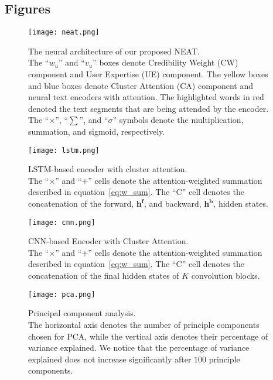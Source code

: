 \documentclass{bmcart}
\begin{document}
\begin{backmatter}
\pagebreak

\section*{Figures}
\begin{figure}[h!]
    \centering
    \captionsetup{justification=centering}
    \texttt{[image: neat.png]}
    \caption{The neural architecture of our proposed NEAT. \\ The ``$w_u$'' and ``$v_u$'' boxes denote Credibility Weight (CW) component and User Expertise (UE) component. The yellow boxes and blue boxes denote Cluster Attention (CA) component and neural text encoders with attention. The highlighted words in red denoted the text segments that are being attended by the encoder. The ``$\times$'', ``$\sum$'', and ``$\sigma$'' symbols denote the multiplication, summation, and sigmoid, respectively.}
    \label{fig:NEAT}
\end{figure}
\pagebreak
\begin{figure}[h!]
    \centering
    \captionsetup{justification=centering}
    \texttt{[image: lstm.png]}
    \caption{LSTM-based encoder with cluster attention. \\ The ``$\times$'' and ``$+$'' cells denote the attention-weighted summation described in equation~\ref{eq:w_sum}. The ``$\text{C}$'' cell denotes the concatenation of the forward, $\boldsymbol{h^f}$, and backward, $\boldsymbol{h^b}$, hidden states.}
    \label{fig:RNNEncoders}
\end{figure}
\pagebreak
\begin{figure}[h!]
    \centering
    \captionsetup{justification=centering}
    \texttt{[image: cnn.png]}
    \caption{CNN-based Encoder with Cluster Attention. \\ The ``$\times$'' and ``$+$'' cells denote the attention-weighted summation described in equation~\ref{eq:w_sum}. The ``$\text{C}$'' cell denotes the concatenation of the final hidden states of $K$ convolution blocks.}
    \label{fig:CNNEncoders}
\end{figure}
\pagebreak
\begin{figure}[h!]
    \centering
    \captionsetup{justification=centering}
    \texttt{[image: pca.png]}
    \caption{Principal component analysis. \\ The horizontal axis denotes the number of principle components chosen for PCA, while the vertical axis denotes their percentage of variance explained. We notice that the percentage of variance explained does not increase significantly after $100$ principle components.}

\end{figure}
\end{backmatter}
\end{document}
